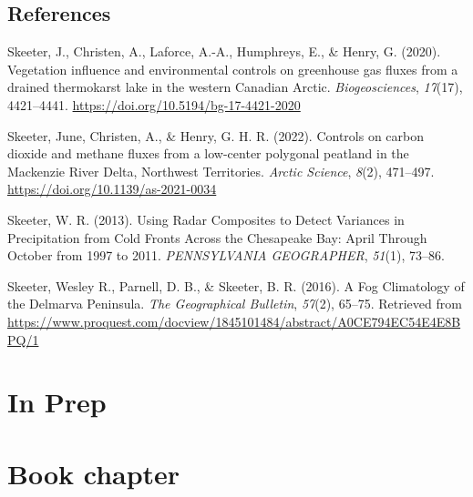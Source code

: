 \documentclass[
]{article}
\newlength{\cslhangindent}
\newlength{\cslentryspacingunit} %
\newenvironment{CSLReferences}[2] %
 {%
  \setlength{\parindent}{0pt}
  \ifodd #1
  \let\oldpar\par
  \def\par{\hangindent=\cslhangindent\oldpar}
  \fi
  \setlength{\parskip}{#2\cslentryspacingunit}
 }%
 {}
\begin{document}
\hypertarget{bibliography-2}{%
\subsection*{References}\label{bibliography-2}}

\hypertarget{refs-2}{}
\begin{CSLReferences}{1}{0}
\leavevmode{}%
Skeeter, J., Christen, A., Laforce, A.-A., Humphreys, E., \& Henry, G.
(2020). Vegetation influence and environmental controls on greenhouse
gas fluxes from a drained thermokarst lake in the western {Canadian}
{Arctic}. \emph{Biogeosciences}, \emph{17}(17), 4421--4441.
\url{https://doi.org/10.5194/bg-17-4421-2020}

\leavevmode{}%
Skeeter, June, Christen, A., \& Henry, G. H. R. (2022). Controls on
carbon dioxide and methane fluxes from a low-center polygonal peatland
in the {Mackenzie} {River} {Delta}, {Northwest} {Territories}.
\emph{Arctic Science}, \emph{8}(2), 471--497.
\url{https://doi.org/10.1139/as-2021-0034}

\leavevmode{}%
Skeeter, W. R. (2013). Using {Radar} {Composites} to {Detect}
{Variances} in {Precipitation} from {Cold} {Fronts} {Across} the
{Chesapeake} {Bay}: {April} {Through} {October} from 1997 to 2011.
\emph{PENNSYLVANIA GEOGRAPHER}, \emph{51}(1), 73--86.

\leavevmode{}%
Skeeter, Wesley R., Parnell, D. B., \& Skeeter, B. R. (2016). A {Fog}
{Climatology} of the {Delmarva} {Peninsula}. \emph{The Geographical
Bulletin}, \emph{57}(2), 65--75. Retrieved from
\url{https://www.proquest.com/docview/1845101484/abstract/A0CE794EC54E4E8BPQ/1}

\end{CSLReferences}

\hypertarget{in-prep}{%
\section{In Prep}\label{in-prep}}

\hypertarget{book-chapter}{%
\section{Book chapter}\label{book-chapter}}
\end{document}

